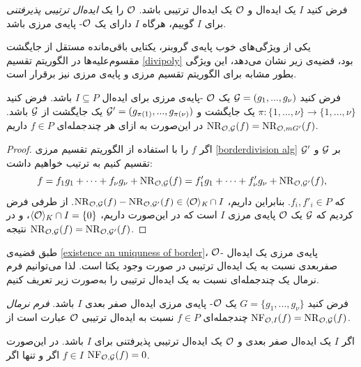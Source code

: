\begin{definition}
فرض کنید 
$I$
یک ایده‌ال و 
${\mathcal O}$
یک ایده‌ال ترتیبی باشد. 
${\mathcal O}$
را یک 
\textit{ایده‌ال ترتیبی پذیرفتنی }
برای 
$I$
گوییم، هرگاه 
$I$
دارای یک 
${\mathcal O}$-
پایه‌ی مرزی باشد.
\end{definition}

یکی از ویژگی‌های خوب پایه‌ی گروبنر، یکتایی باقی‌مانده مستقل از جایگشت مقسوم‌علیه‌ها در الگوریتم تقسیم
\ref{divipoly}
بود، قضیه‌ی زیر نشان می‌دهد، این ویژگی بطور مشابه برای الگوریتم تقسیم مرزی و پایه‌ی مرزی نیز برقرار است.

\begin{theorem}
فرض کنید 
${\mathcal G} = (g_{1},...,g_{\nu})$
یک 
${\mathcal O}$
-پایه‌ی مرزی برای ایده‌ال 
$I\subseteq P$
باشد. فرض کنید 
$\pi:\{1,...,\nu\}\rightarrow\{1,...,\nu\}$
یک جایگشت و 
${\mathcal G}' = (g_{\pi(1)},...,g_{\pi(\nu)})$
یک جایگشت از 
${\mathcal G}$
باشد. در این‌صورت به ازای هر چندجمله‌ای 
$f\in P$
داریم
$\operatorname{\mathrm{NR}}_{{\mathcal O}, {\mathcal G}}(f) = \operatorname{\mathrm{NR}}_{{\mathcal O},mG'}(f)$.
\end{theorem}
\begin{proof}
اگر 
$f$
را با استفاده از الگوریتم تقسیم مرزی 
\ref{borderdivision alg}
بر 
${\mathcal G}$
و
${\mathcal G}'$
تقسیم کنیم به ترتیب خواهیم داشت:
$$f = f_{1}g_{1}+\cdots + f_{\nu}g_{\nu} + \operatorname{\mathrm{NR}}_{{\mathcal O},{\mathcal G}}(f) = f'_{1}g_{1} + \cdots + f'_{\nu}g_{\nu} + \operatorname{\mathrm{NR}}_{{\mathcal O},{\mathcal G}'}(f),$$
که 
$f_{i},f'_{i}\in P$.
بنابراین داریم، 
$\operatorname{\mathrm{NR}}_{{\mathcal O},{\mathcal G}}(f) - \operatorname{\mathrm{NR}}_{{\mathcal O},{\mathcal G}'}(f)\in \langle {\mathcal O}\rangle_{\textit{K}}\cap I$.
از طرفی فرض کردیم که 
${\mathcal G}$
یک 
${\mathcal O}$
پایه‌ی مرزی 
$I$
است که در این‌صورت داریم،
$\langle{\mathcal O}\rangle_{K}\cap I = \{0\}$،
و در نتیجه 
$\operatorname{\mathrm{NR}}_{{\mathcal O},{\mathcal G}}(f) = \operatorname{\mathrm{NR}}_{{\mathcal O},{\mathcal G}'}(f)$.
\end{proof}
طبق قضیه‌ی 
\ref{existence an uniquness of border}،
${\mathcal O}$-
پایه‌ی مرزی یک ایده‌ال صفربعدی نسبت به یک ایده‌ال ترتیبی در صورت وجود یکتا است. لذا می‌توانیم فرم نرمال یک چندجمله‌ای نسبت به یک ایده‌ال ترتیبی را به‌صورت زیر تعریف کنیم.
\begin{definition}
فرض کنید 
$G = \{g_{1},...,g_{\nu}\}$
یک 
${\mathcal O}$-
پایه‌ی مرزی ایده‌ال صفر بعدی
$I$
باشد. 
\textit{فرم نرمال}
چندجمله‌ای 
$f\in P$
نسبت به ایده‌ال ترتیبی 
${\mathcal O}$
عبارت است از 
$\operatorname{\mathrm{NF}}_{{\mathcal O},I}(f) = \operatorname{\mathrm{NR}}_{{\mathcal O},{\mathcal G}}(f)$.
\end{definition}
 
\begin{corollary}
اگر 
$I$
یک ایده‌ال صفر بعدی و 
${\mathcal O}$
یک ایده‌ال ترتیبی پذیرفتنی برای 
$I$
باشد. در این‌صورت
$f\in I$
اگر و تنها اگر 
$\operatorname{\mathrm{NF}}_{{\mathcal O},{\mathcal G}}(f) = 0$.
\end{corollary}

